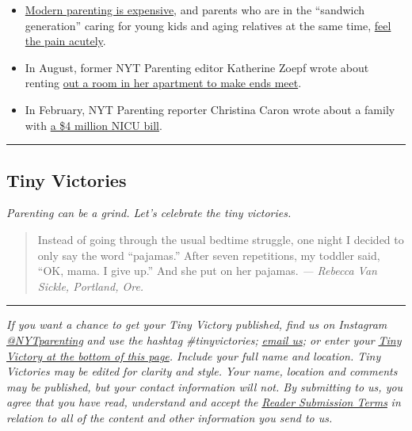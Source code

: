 \begin{itemize}
\item
  \href{https://www.nytimes3xbfgragh.onion/spotlight/price-of-modern-parenting}{Modern
  parenting is expensive}, and parents who are in the ``sandwich
  generation'' caring for young kids and aging relatives at the same
  time,
  \href{https://www.nytimes3xbfgragh.onion/2020/02/11/parenting/sandwich-generation-costs.html}{feel
  the pain acutely}.
\item
  In August, former NYT Parenting editor Katherine Zoepf wrote about
  renting
  \href{https://www.nytimes3xbfgragh.onion/2019/08/27/parenting/parents-money-stress.html}{out
  a room in her apartment to make ends meet}.
\item
  In February, NYT Parenting reporter Christina Caron wrote about a
  family with
  \href{https://www.nytimes3xbfgragh.onion/2020/02/11/parenting/nicu-costs.html}{a
  \$4 million NICU bill}.
\end{itemize}

\begin{center}\rule{0.5\linewidth}{\linethickness}\end{center}

\hypertarget{tiny-victories}{%
\subsection{Tiny Victories}\label{tiny-victories}}

\emph{Parenting can be a grind. Let's celebrate the tiny victories.}

\begin{quote}
Instead of going through the usual bedtime struggle, one night I decided
to only say the word ``pajamas.'' After seven repetitions, my toddler
said, ``OK, mama. I give up.'' And she put on her pajamas. \emph{---
Rebecca Van Sickle, Portland, Ore.}
\end{quote}

\begin{center}\rule{0.5\linewidth}{\linethickness}\end{center}

\emph{If you want a chance to get your Tiny Victory published, find us
on Instagram}
\href{https://www.instagram.com/nytparenting/}{\emph{@NYTparenting}}
\emph{and use the hashtag \#tinyvictories;}
\href{mailto:parenting_submissions@NYTimes.com?subject=Tiny\%20Victories}{\emph{email
us}}\emph{; or enter your}
\href{https://www.nytimes3xbfgragh.onion/2019/03/19/reader-center/parenting-section-tiny-victories.html?module=inline}{\emph{Tiny
Victory at the bottom of this page}}\emph{. Include your full name and
location. Tiny Victories may be edited for clarity and style.}
\emph{Your name, location and comments may be published, but your
contact information will not. By submitting to us, you agree that you
have read, understand and accept the}
\href{https://nyti.ms/2Q9M7i0}{\emph{Reader Submission Terms}} \emph{in
relation to all of the content and other information you send to us.}


